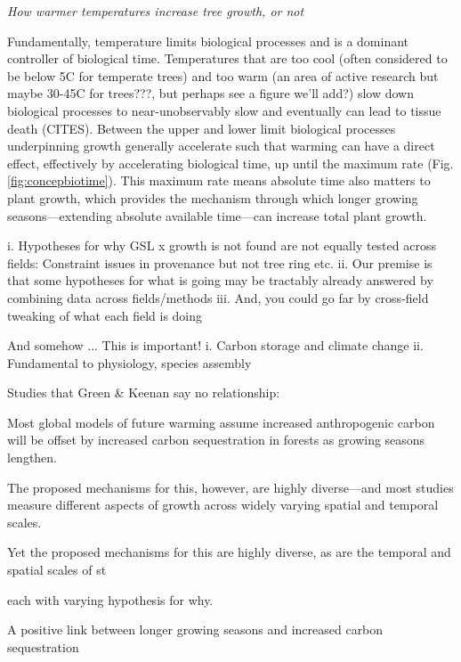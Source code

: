\documentclass[11pt]{article}
\begin{document}
\emph{How warmer temperatures increase tree growth, or not}

Fundamentally, temperature limits biological processes and is a dominant controller of biological time. Temperatures that are too cool (often considered to be below 5C for temperate trees) and too warm (an area of active research but maybe 30-45C for trees???, but perhaps see a figure we'll add?) slow down biological processes to near-unobservably slow and eventually can lead to tissue death (CITES). Between the upper and lower limit biological processes underpinning growth generally accelerate such that warming can have a direct effect, effectively by accelerating biological time, up until the maximum rate (Fig. \ref{fig:concepbiotime}). This maximum rate means absolute time also matters to plant growth, which provides the mechanism through which longer growing seasons---extending absolute available time---can increase total plant growth. %
 


i. Hypotheses for why GSL x growth is not found are not equally tested across fields: Constraint issues in provenance but not tree ring etc.
ii. Our premise is that some hypotheses for what is going may be tractably already answered by combining data across fields/methods
iii. And, you could go far by cross-field tweaking of what each field is doing

And somehow ... This is important!
i. Carbon storage and climate change
ii. Fundamental to physiology, species assembly

Studies that Green \& Keenan say no relationship:

Most global models of future warming assume increased anthropogenic carbon will be offset by increased carbon sequestration in forests as growing seasons lengthen.

The proposed mechanisms for this, however, are highly diverse---and most studies measure different aspects of growth across widely varying spatial and temporal scales. 

Yet the proposed mechanisms for this are highly diverse, as are the temporal and spatial scales of st


each with varying hypothesis for why. 

A positive link between longer growing seasons and increased carbon sequestration 
\end{document}
